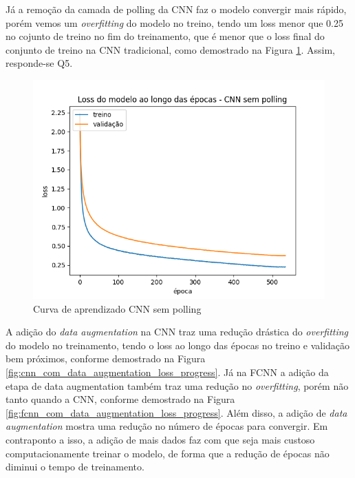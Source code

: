 \documentclass[12pt]{article}
\begin{document}
Já a remoção da camada de polling da CNN faz o modelo convergir mais rápido, porém vemos um \textit{overfitting} do modelo no treino, tendo um loss menor que 0.25 no cojunto de treino no fim do treinamento, que é menor que o loss final do conjunto de treino na CNN tradicional, como demostrado na Figura \ref{fig:cnn_sem_polling_loss_progress}. Assim, responde-se Q5.


\begin{figure}[ht]
  \centering
  \includegraphics[width=.5\textwidth]{../images/results_plt/cnn_sem_polling_loss_progress.png}
  \caption{Curva de aprendizado CNN sem polling}
  \label{fig:cnn_sem_polling_loss_progress}
\end{figure}

A adição do \textit{data augmentation} na CNN traz uma redução drástica do \textit{overfitting} do modelo no treinamento, tendo o loss ao longo das épocas no treino e validação bem próximos, conforme demostrado na Figura \ref{fig:cnn_com_data_augmentation_loss_progress}. Já na FCNN a adição da etapa de data augmentation também traz uma redução no \textit{overfitting}, porém não tanto quando a CNN, conforme demostrado na Figura \ref{fig:fcnn_com_data_augmentation_loss_progress}. Além disso, a adição de \textit{data augmentation} mostra uma redução no número de épocas para convergir. Em contraponto a isso, a adição de mais dados faz com que seja mais custoso computacionamente treinar o modelo, de forma que a redução de épocas não diminui o tempo de treinamento. 
\end{document}

